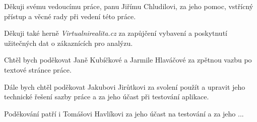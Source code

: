 Děkuji svému vedoucímu práce, panu Jiřímu Chludilovi, za jeho pomoc, vstřícný přístup a věcné rady při vedení této práce.

Děkuji také herně \emph{Virtualnirealita.cz} za zapůjčení vybavení a poskytnutí užitečných dat o zákaznících pro analýzu.

Chtěl bych poděkovat Janě Kubíčkové a Jarmile Hlaváčové za zpětnou vazbu po textové stránce práce.

Dále bych chtěl poděkovat Jakubovi Jirůtkovi za svolení použít a upravit jeho technické řešení sazby práce a za jeho účast při testování aplikace.

Poděkování patří i Tomášovi Havlíkovi za jeho účast na testování a za jeho ...